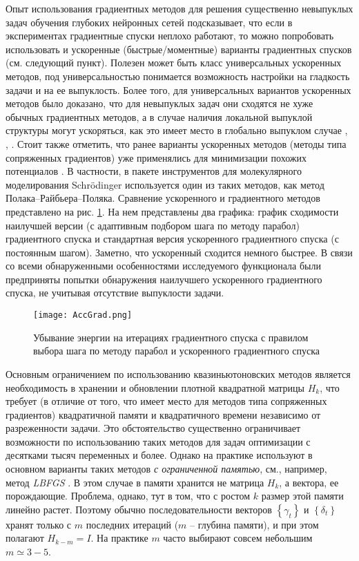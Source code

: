   Опыт использования градиентных методов для решения существенно невыпуклых задач обучения глубоких нейронных сетей \cite{Goodfellow2017} подсказывает, что если в экспериментах градиентные спуски неплохо работают, то можно попробовать использовать и ускоренные (быстрые/моментные) варианты градиентных спусков (см. следующий пункт). 
  Полезен может быть класс универсальных ускоренных методов, под универсальностью понимается возможность настройки на гладкость задачи и на ее выпуклость. Более того, для универсальных вариантов ускоренных методов было доказано, что для невыпуклых задач они сходятся не хуже обычных градиентных методов, а в случае наличия локальной выпуклой структуры могут ускоряться, как это имеет место в глобально выпуклом случае \cite{ghadimi2015generalized}, \cite{guminov2019accelerated}, \cite{guminov2019universal}. Стоит также отметить, что ранее варианты ускоренных методов (методы типа сопряженных градиентов) уже применялись для минимизации похожих потенциалов \cite{wales1997global}. В частности, в пакете инструментов для молекулярного моделирования Schrödinger \cite{sastry2013protein} используется один из таких методов, как метод Полака--Райбьера--Поляка. Сравнение ускоренного и градиентного методов представлено на рис. \ref{AG}.  На нем представлены два графика: график сходимости наилучшей версии (с адаптивным подбором шага по методу парабол) градиентного спуска и стандартная версия ускоренного градиентного спуска (с постоянным шагом). Заметно, что ускоренный сходится немного быстрее. В связи со всеми обнаруженными особенностями исследуемого функционала были предприняты попытки обнаружения наилучшего ускоренного градиентного спуска, не учитывая отсутствие выпуклости задачи. 

  \begin{figure}
  \begin{center}
  \texttt{[image: AccGrad.png]}
  \end{center}
  \caption{Убывание энергии на итерациях градиентного спуска с правилом выбора шага по методу парабол и ускоренного градиентного спуска}
   \label{AG}
  \end{figure}


  Основным ограничением по использованию квазиньютоновских методов является необходимость в хранении и обновлении плотной квадратной матрицы $H_k $, что требует (в отличие от того, что имеет место для методов типа сопряженных градиентов) квадратичной памяти и квадратичного времени независимо от разреженности задачи. Это обстоятельство существенно ограничивает возможности по использованию таких методов для задач оптимизации с десятками тысяч переменных и более. Однако на практике используют в основном варианты таких методов \textit{с ограниченной памятью}, см., например, метод \textit{LBFGS} \cite{nocedal2006sequential}. В этом случае в памяти хранится не матрица $H_k $, а вектора, ее порождающие. Проблема, однако, тут в том, что с ростом $k$ размер этой памяти линейно растет. Поэтому обычно последовательности векторов $\left\{ {\gamma _t } \right\}$ и $\left\{ {\delta _t } \right\}$ хранят только с $m$ последних итераций ($m$ -- глубина памяти), и при этом полагают $H_{k-m} =I$. На практике $m$ часто выбирают совсем небольшим $m\simeq 3-5$.

